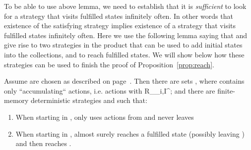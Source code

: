 \documentclass[a4paper,UKenglish]{lipics}
\newcommand{\rabin}{R}
\newcommand{\fix}[1]{{#1^\star}}
\newcommand{\fixI}{\fix{I}}
\begin{document}
To be able to use above lemma, we need to establish that it is {\em sufficient} to look for a strategy that visits fulfilled states infinitely often. In other words that existence of the satisfying strategy  implies existence of a strategy that visits fulfilled states infinitely often.
Here we use the following lemma saying that  and  give rise to two
strategies in the product  that can be used to add initial states into the collections, and to
reach fulfilled states. We will show below how these strategies can be used to finish the proof of Proposition~\ref{prop:reach}.

\begin{lemma}\label{prop:screwing-paths}
Assume  are chosen as described on page~\pageref{page:sqI}.	
	Then there are sets ,  where 
	 contains only ``accumulating`` actions, i.e. actions  with \rabin_{\varphi_i,\fixI};
	and there are finite-memory deterministic strategies  and  such that:
	\begin{enumerate} 
		\item\label{item:screwing-a}
		When starting in ,  only uses actions from  and never leaves 
		\item\label{item:screwing-c} When starting in ,   almost surely reaches a fulfilled state (possibly leaving ) and then reaches .
	\end{enumerate}
\end{lemma}
\end{document}
